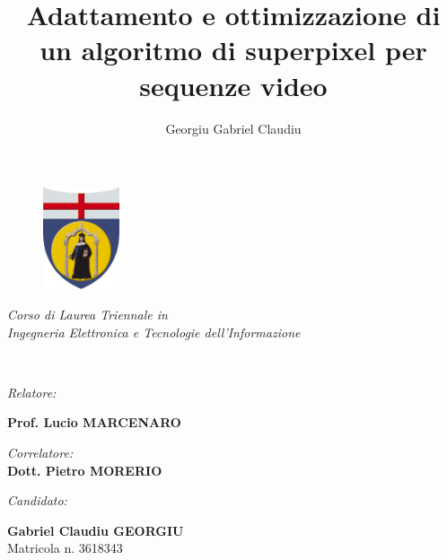 \documentclass[12pt,a4paper,oneside]{article}
\author{Georgiu Gabriel Claudiu}
\title{Adattamento e ottimizzazione di un algoritmo di superpixel per sequenze video}
\begin{document}
\thispagestyle{empty}
\begin{spacing}{1.3}
	\begin{center}
		\noindent{}
		\noindent{}	
		
		\begin{figure}[!htb]
			\centering
			\includegraphics[height=30mm]{resources/logo.png}
		\end{figure}
	
		\begin{minipage}[!htb]{\textwidth}
			\begin{singlespace}
				\begin{center}
					{\itshape Corso di Laurea Triennale in\\ Ingegneria Elettronica e Tecnologie dell'Informazione} 
				\end{center}
			\end{singlespace}
		\end{minipage}
		
		\noindent\hrulefill\\
		
		\vfill
		
		\noindent{}
	\end{center}
	
	\vfill
	
	\noindent\begin{minipage}[t]{\textwidth-5.9cm}
		\textit{Relatore:}
		\begin{singlespace}
			\textbf{Prof. Lucio MARCENARO}\\
		\end{singlespace}
		\textit{Correlatore:}\\
		\textbf{Dott. Pietro MORERIO} 
	\end{minipage}%
	\noindent\begin{minipage}[t]{5.8cm}
		\textit{Candidato:}		
		\begin{singlespace}
			\textbf{Gabriel Claudiu GEORGIU}\\
			Matricola n. 3618343
		\end{singlespace}
	\end{minipage}%
	

\end{spacing}
\end{document}
